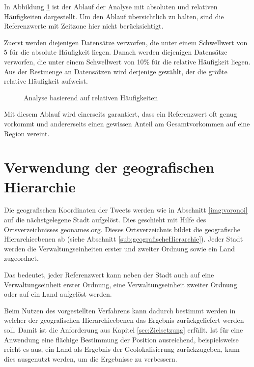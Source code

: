 				In Abbildung \ref{img:relHaufBsp} ist der Ablauf der Analyse mit absoluten und relativen Häufigkeiten dargestellt.
				Um den Ablauf übersichtlich zu halten, sind die Referenzwerte mit Zeitzone hier nicht berücksichtigt.
				
				Zuerst werden diejenigen Datensätze verworfen, die unter einem Schwellwert von 5 für die absolute Häufigkeit liegen.
				Danach werden diejenigen Datensätze verworfen, die unter einem Schwellwert von 10\% für die relative Häufigkeit liegen.
				Aus der Restmenge an Datensätzen wird derjenige gewählt, der die größte relative Häufigkeit aufweist. 

				 \begin{figure}[!ht]
	
						\centering
						\caption{Analyse basierend auf relativen Häufigkeiten}
						\label{img:relHaufBsp}
					
				\end{figure}

				Mit diesem Ablauf wird einerseits garantiert, dass ein Referenzwert oft genug vorkommt und andererseits einen gewissen Anteil am Gesamtvorkommen auf eine Region vereint.

	\section{Verwendung der geografischen Hierarchie} \label{sec:ausnutzenDerGeografischenHierarchie}

		Die geografischen Koordinaten der Tweets werden wie in Abschnitt \ref{img:voronoi} auf die nächstgelegene Stadt aufgelöst. 
		Dies geschieht mit Hilfe des Ortsverzeichnisses geonames.org. 	
		Dieses Ortsverzeichnis bildet die geografische Hierarchieebenen ab (siehe Abschnitt \ref{sub:geografischeHierarchie}). 
		Jeder Stadt werden die Verwaltungseinheiten erster und zweiter Ordnung sowie ein Land zugeordnet.

		Das bedeutet, jeder Referenzwert kann neben der Stadt auch auf eine Verwaltungseinheit erster Ordnung, eine Verwaltungseinheit zweiter Ordnung oder auf ein Land aufgelöst werden.
		
		Beim Nutzen des vorgestellten Verfahrens kann dadurch bestimmt werden in welcher der geografischen Hierarchieebenen das Ergebnis zurückgeliefert werden soll. 
		Damit ist die Anforderung aus Kapitel \ref{sec:Zielsetzung} erfüllt.
		Ist für eine Anwendung eine flächige Bestimmung der Position ausreichend, beispielsweise reicht es aus, ein Land als Ergebnis der Geolokalisierung zurückzugeben, kann dies ausgenutzt werden, um die Ergebnisse zu verbessern.

